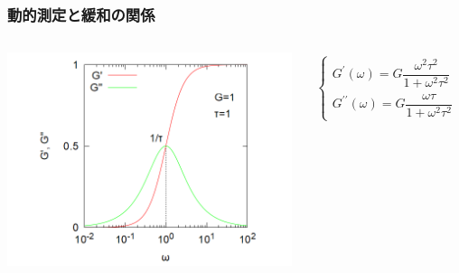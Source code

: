 \documentclass[12pt, dvipdfmx]{beamer}
\begin{document}
\begin{frame}
	\frametitle{動的測定と緩和の関係}
		\vspace{-3mm}
		\begin{columns}[c, onlytextwidth]
					\centering
					\includegraphics[width=\textwidth]{maxwell_dynamic.png}

					\vspace{-5mm}
					\begin{align*}
						\begin{cases}
							G^{\prime}(\omega) = G\dfrac{\omega^2 \tau^2}{1+\omega^2\tau^2} \\[12pt]
							G^{\prime \prime}(\omega) = G\dfrac{\omega \tau}{1+\omega^2\tau^2}
						\end{cases}
					\end{align*}
				

\end{columns}
\end{frame}
\end{document}
